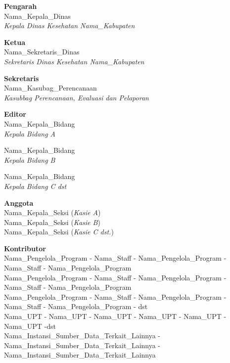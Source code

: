 \begin{center}
\textbf{Pengarah}\\
\smallskip{}
Nama_Kepala_Dinas\\
\emph{Kepala Dinas Kesehatan Nama_Kabupaten}
\bigskip{}

\textbf{Ketua}\\
\smallskip{}
Nama_Sekretaris_Dinas\\
\emph{Sekretaris Dinas Kesehatan Nama_Kabupaten}
\bigskip{}

\textbf{Sekretaris}\\
\smallskip{}
Nama_Kasubag_Perencanaan\\
\emph{Kasubbag Perencanaan, Evaluasi dan Pelaporan}
\bigskip{}

\textbf{Editor}\\
\smallskip
Nama_Kepala_Bidang\\
\emph{Kepala Bidang A}
\smallskip

Nama_Kepala_Bidang\\
\emph{Kepala Bidang B}
\smallskip

Nama_Kepala_Bidang\\
\emph{Kepala Bidang C dst}
\smallskip

\bigskip

\textbf{Anggota}\\
\smallskip
Nama_Kepala_Seksi (\emph{Kasie A})\\
\smallskip
Nama_Kepala_Seksi (\emph{Kasie B})\\
\smallskip
Nama_Kepala_Seksi (\emph{Kasie C dst.})\\
\bigskip

\textbf{Kontributor}\\
\smallskip
Nama_Pengelola_Program - Nama_Staff - Nama_Pengelola_Program - Nama_Staff - Nama_Pengelola_Program\\
\smallskip
Nama_Pengelola_Program - Nama_Staff - Nama_Pengelola_Program - Nama_Staff - Nama_Pengelola_Program\\
\smallskip
Nama_Pengelola_Program - Nama_Staff - Nama_Pengelola_Program - Nama_Staff - Nama_Pengelola_Program - dst\\
\smallskip
Nama_UPT - Nama_UPT - Nama_UPT - Nama_UPT - Nama_UPT - Nama_UPT -dst\\
\smallskip
Nama_Instansi_Sumber_Data_Terkait_Lainnya - Nama_Instansi_Sumber_Data_Terkait_Lainnya - Nama_Instansi_Sumber_Data_Terkait_Lainnya\\
\end{center}

